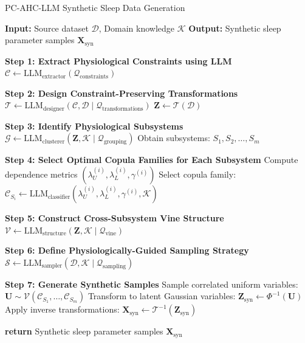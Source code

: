 \documentclass[preprint,12pt]{elsarticle}
\begin{document}
\begin{algorithm}[h]
\caption{PC-AHC-LLM Synthetic Sleep Data Generation}\label{alg:pc-ahc-llm}
\begin{algorithmic}[1]
\STATE \textbf{Input:} Source dataset $\mathcal{D}$, Domain knowledge $\mathcal{K}$
\STATE \textbf{Output:} Synthetic sleep parameter samples $\mathbf{X}_{\text{syn}}$

\STATE \textbf{Step 1: Extract Physiological Constraints using LLM}
\STATE \hspace{0.2cm} $\mathcal{C} \gets \text{LLM}_{\text{extractor}}(\mathcal{Q}_{\text{constraints}})$

\STATE \textbf{Step 2: Design Constraint-Preserving Transformations}
\STATE \hspace{0.2cm} $\mathcal{T} \gets \text{LLM}_{\text{designer}}(\mathcal{C}, \mathcal{D} \mid \mathcal{Q}_{\text{transformations}})$
\STATE \hspace{0.2cm} $\mathbf{Z} \gets \mathcal{T}(\mathcal{D})$

\STATE \textbf{Step 3: Identify Physiological Subsystems}
\STATE \hspace{0.2cm} $\mathcal{G} \gets \text{LLM}_{\text{clusterer}}(\mathbf{Z}, \mathcal{K} \mid \mathcal{Q}_{\text{grouping}})$
\STATE \hspace{0.2cm} Obtain subsystems: $S_1, S_2, \dots, S_m$

\STATE \textbf{Step 4: Select Optimal Copula Families for Each Subsystem}
    \STATE Compute dependence metrics $(\lambda_U^{(i)}, \lambda_L^{(i)}, \gamma^{(i)})$
    \STATE Select copula family: $\mathcal{C}_{S_i} \gets \text{LLM}_{\text{classifier}}(\lambda_U^{(i)}, \lambda_L^{(i)}, \gamma^{(i)}, \mathcal{K})$
\ENDFOR

\STATE \textbf{Step 5: Construct Cross-Subsystem Vine Structure}
\STATE \hspace{0.2cm} $\mathcal{V} \gets \text{LLM}_{\text{structure}}(\mathbf{Z}, \mathcal{K} \mid \mathcal{Q}_{\text{vine}})$

\STATE \textbf{Step 6: Define Physiologically-Guided Sampling Strategy}
\STATE \hspace{0.2cm} $\mathcal{S} \gets \text{LLM}_{\text{sampler}}(\mathcal{D}, \mathcal{K} \mid \mathcal{Q}_{\text{sampling}})$

\STATE \textbf{Step 7: Generate Synthetic Samples}
\STATE \hspace{0.2cm} Sample correlated uniform variables: $\mathbf{U} \sim \mathcal{V}(\mathcal{C}_{S_1}, \dots, \mathcal{C}_{S_m})$
\STATE \hspace{0.2cm} Transform to latent Gaussian variables: $\mathbf{Z}_{\text{syn}} \gets \Phi^{-1}(\mathbf{U})$
\STATE \hspace{0.2cm} Apply inverse transformations: $\mathbf{X}_{\text{syn}} \gets \mathcal{T}^{-1}(\mathbf{Z}_{\text{syn}})$

\STATE \textbf{return} Synthetic sleep parameter samples $\mathbf{X}_{\text{syn}}$
\end{algorithmic}
\end{algorithm}
\end{document}
